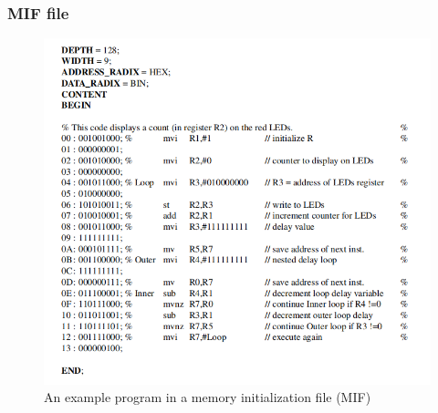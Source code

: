 \subsubsection{MIF file}
\begin{figure}[h]
    \centering
    \includegraphics[scale = 0.65]{source/picture/Lab10/pic7.png}
    \caption{An example program in a memory initialization file (MIF)}
\end{figure}
